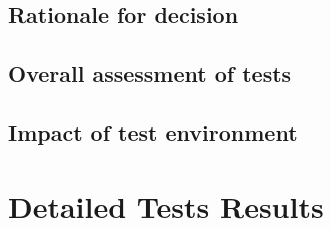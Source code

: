 \documentclass[runningheads,a4paper]{article}
\begin{document}
	\subsection{Rationale for decision}

	\subsection{Overall assessment of tests}

	\subsection{Impact of test environment}

\section{Detailed Tests Results}
	
\end{document}
